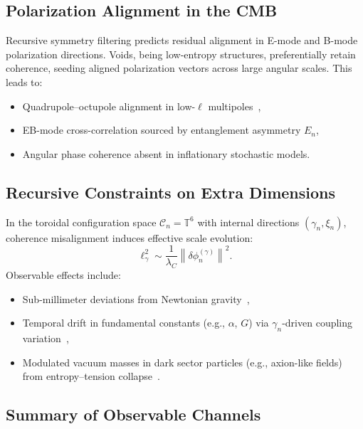 \subsection{Polarization Alignment in the CMB}

Recursive symmetry filtering predicts residual alignment in E-mode and B-mode polarization directions. Voids, being low-entropy structures, preferentially retain coherence, seeding aligned polarization vectors across large angular scales. This leads to:
\begin{itemize}
  \item Quadrupole–octupole alignment in low-$\ell$ multipoles~\cite{planck2018cmb},
  \item EB-mode cross-correlation sourced by entanglement asymmetry $E_n$,
  \item Angular phase coherence absent in inflationary stochastic models.
\end{itemize}

\subsection{Recursive Constraints on Extra Dimensions}

In the toroidal configuration space $\mathcal{C}_n = \mathbb{T}^6$ with internal directions $(\gamma_n, \xi_n)$, coherence misalignment induces effective scale evolution:
\[
\ell^2_{\gamma} \sim \frac{1}{\lambda_C} \left\| \delta \phi_n^{(\gamma)} \right\|^2.
\]
Observable effects include:
\begin{itemize}
  \item Sub-millimeter deviations from Newtonian gravity~\cite{adelberger2009torsion},
  \item Temporal drift in fundamental constants (e.g., $\alpha$, $G$) via $\gamma_n$-driven coupling variation~\cite{uzan2011varying},
  \item Modulated vacuum masses in dark sector particles (e.g., axion-like fields) from entropy–tension collapse~\cite{ringwald2012axions}.
\end{itemize}

\subsection{Summary of Observable Channels}


